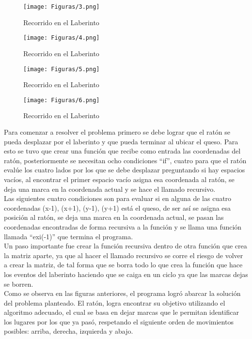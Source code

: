 \documentclass[
  letterpaper, 
  maincolor=black,
  sectioncolor=black!90,
  subsectioncolor=black!70,
  itemtextcolor=black!40,
]{fortysecondscv}
\begin{document}
\begin{figure}[H]
	\centering
	\texttt{[image: Figuras/3.png]}
	\caption{Recorrido en el Laberinto}
\end{figure}

\begin{figure}[H]
	\centering
	\texttt{[image: Figuras/4.png]}
	\caption{Recorrido en el Laberinto}
\end{figure}

\begin{figure}[H]
	\centering
	\texttt{[image: Figuras/5.png]}
	\caption{Recorrido en el Laberinto}
\end{figure}

\begin{figure}[H]
	\centering
	\texttt{[image: Figuras/6.png]}
	\caption{Recorrido en el Laberinto}
\end{figure}

Para comenzar a resolver el problema primero se debe lograr que el ratón se pueda desplazar por el laberinto y que pueda terminar al ubicar el queso. Para esto se tuvo que crear una función que recibe como entrada las coordenadas del ratón, posteriormente se necesitan ocho condiciones “if”, cuatro para que el ratón evalúe los cuatro lados por los que se debe desplazar preguntando si hay espacios vacíos, al encontrar el primer espacio vacío asigna esa coordenada al ratón, se deja una marca en la coordenada actual y se hace el llamado recursivo.\\

Las siguientes cuatro condiciones son para evaluar si en alguna de las cuatro coordenadas (x-1), (x+1), (y-1), (y+1) está el queso, de ser así se asigna esa posición al ratón, se deja una marca en la coordenada actual, se pasan las coordenadas encontradas de forma recursiva a la función y se llama una función llamada “exi(-1)” que termina el programa.\\

Un paso importante fue crear la función recursiva dentro de otra función que crea la matriz aparte, ya que al hacer el llamado recursivo se corre el riesgo de volver a crear la matriz, de tal forma que se borra todo lo que crea la función que hace los eventos del laberinto haciendo que se caiga en un ciclo ya que las marcas dejas se borren.\\


Como se observa en las figuras anteriores, el programa logró abarcar la solución del problema planteado. El ratón, logra encontrar su objetivo utilizando el algoritmo adecuado, el cual se basa en dejar marcas que le permitan identificar los lugares por los que ya pasó, respetando el siguiente orden de movimientos posibles: arriba, derecha, izquierda y abajo.\\
\end{document}
